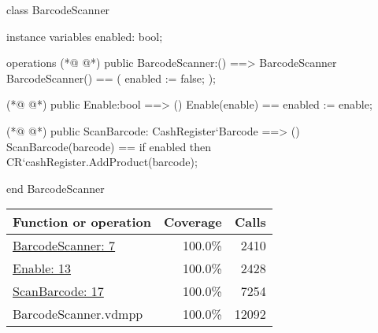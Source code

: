 \begin{vdmpp}
class BarcodeScanner

instance variables
 enabled: bool;
 
operations
(*@
\label{BarcodeScanner:7}
@*)
 public BarcodeScanner:() ==> BarcodeScanner
 BarcodeScanner() ==
 (
  enabled := false;
 );

(*@
\label{Enable:13}
@*)
 public Enable:bool ==> ()
 Enable(enable) ==
  enabled := enable;

(*@
\label{ScanBarcode:17}
@*)
 public ScanBarcode: CashRegister`Barcode ==> ()
 ScanBarcode(barcode) ==
  if enabled then
   CR`cashRegister.AddProduct(barcode);
   
end BarcodeScanner
\end{vdmpp}
\bigskip
\begin{longtable}{|l|r|r|}
\hline
Function or operation & Coverage & Calls \\
\hline
\hline
\hyperref[BarcodeScanner:7]{BarcodeScanner: 7} & 100.0\% & 2410 \\
\hline
\hyperref[Enable:13]{Enable: 13} & 100.0\% & 2428 \\
\hline
\hyperref[ScanBarcode:17]{ScanBarcode: 17} & 100.0\% & 7254 \\
\hline
\hline
BarcodeScanner.vdmpp & 100.0\% & 12092 \\
\hline
\end{longtable}

